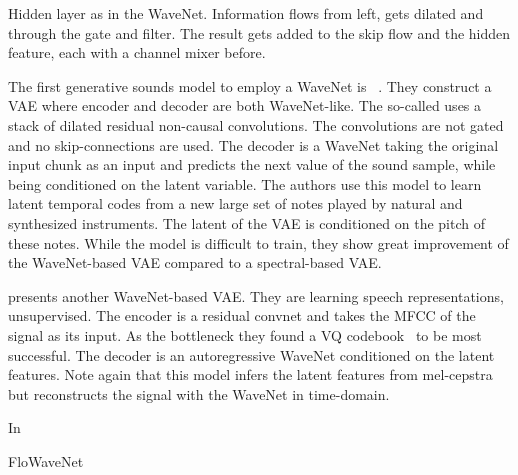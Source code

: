 \begin{marginfigure}
    
    \caption{Hidden layer as in the WaveNet. Information flows from left, gets dilated and through the gate and filter. The result gets added to the skip flow and the hidden feature, each with a channel mixer before.}%
    \label{fig:wavenet_layer}
\end{marginfigure}


The first generative sounds model to employ a WaveNet is ~\cite{kalchbrennerEfficient2018}. They construct a VAE where encoder and decoder are both WaveNet-like. The so-called  uses a stack of dilated residual non-causal convolutions. The convolutions are not gated and no skip-connections are used. The decoder is a WaveNet taking the original input chunk as an input and predicts the next value of the sound sample, while being conditioned on the latent variable. The authors use this model to learn latent temporal codes from a new large set of notes played by natural and synthesized instruments. The latent of the VAE is conditioned on the pitch of these notes. While the model is difficult to train, they show great improvement of the WaveNet-based VAE compared to a spectral-based VAE.

\textcite{chorowskiUnsupervised2019} presents another WaveNet-based VAE. They are learning speech representations, unsupervised. The encoder is a residual convnet and takes the MFCC of the signal as its input. As the bottleneck they found a VQ codebook~\cite{vandenoordNeural2017} to be most successful. The decoder is an autoregressive WaveNet conditioned on the latent features. Note again that this model infers the latent features from mel-cepstra but reconstructs the signal with the WaveNet in time-domain.

In~\cite{prengerWaveGlow2018}

FloWaveNet~\cite{kimFloWaveNet2019a}

